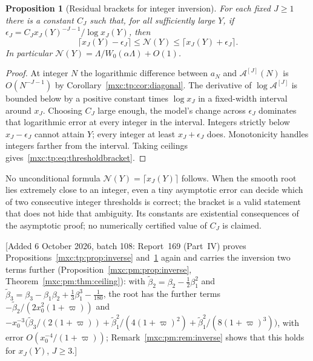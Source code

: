 \documentclass[11pt]{article}
\numberwithin{equation}{section}
\newtheorem{proposition}[theorem]{Proposition}
\theoremstyle{definition}
\theoremstyle{remark}
\begin{document}
\begin{proposition}[Residual brackets for integer inversion]\label{mxc:tp:prop:threshold}
For each fixed $J\ge1$ there is a constant $C_J$ such that, for all
sufficiently large $Y$, if
$\epsilon_J=C_Jx_J(Y)^{-J-1}/\log x_J(Y)$, then
\begin{equation}\label{mxc:tp:eq:thresholdbracket}
 \bigl\lceil x_J(Y)-\epsilon_J\bigr\rceil\le\mathcal N(Y)\le
 \bigl\lceil x_J(Y)+\epsilon_J\bigr\rceil.
\end{equation}
In particular $\mathcal N(Y)=\Lambda/W_0(\alpha\Lambda)+O(1)$.
\end{proposition}
\begin{proof}
At integer $N$ the logarithmic difference between $a_N$ and
$\mathcal A^{[J]}(N)$ is $O(N^{-J-1})$ by
Corollary~\ref{mxc:tp:cor:diagonal}. The derivative of
$\log\mathcal A^{[J]}$ is bounded below by a positive constant times
$\log x_J$ in a fixed-width interval around $x_J$. Choosing $C_J$ large
enough, the model's change across $\epsilon_J$ dominates that logarithmic
error at every integer in the interval. Integers strictly below
$x_J-\epsilon_J$ cannot attain $Y$; every integer at least
$x_J+\epsilon_J$ does. Monotonicity handles integers farther from the
interval. Taking ceilings gives~\eqref{mxc:tp:eq:thresholdbracket}.
\end{proof}

No unconditional formula $\mathcal N(Y)=\lceil x_J(Y)\rceil$ follows. When
the smooth root lies extremely close to an integer, even a tiny asymptotic
error can decide which of two consecutive integer thresholds is correct;
the bracket is a valid statement that does not hide that ambiguity. Its
constants are existential consequences of the asymptotic proof; no
numerically certified value of $C_J$ is claimed.

[Added 6 October 2026, batch 108: Report~169 (Part~IV) proves
Propositions~\ref{mxc:tp:prop:inverse} and~\ref{mxc:tp:prop:threshold} again
and carries the inversion two terms further
(Proposition~\ref{mxc:pm:prop:inverse}, Theorem~\ref{mxc:pm:thm:ceiling}): with
$\widetilde\beta_2=\beta_2-\frac12\beta_1^2$ and
$\widetilde\beta_3=\beta_3-\beta_1\beta_2+\frac13\beta_1^3-\frac1{180}$, the root
has the further terms $-\widetilde\beta_2/(2x_0^2(1+\varpi))$ and
$-x_0^{-3}\bigl(\widetilde\beta_3/(2(1+\varpi))+\widetilde\beta_1^2/(4(1+\varpi)^2)
+\widetilde\beta_1^2/(8(1+\varpi)^3)\bigr)$, with error
$O(x_0^{-4}/(1+\varpi))$; Remark~\ref{mxc:pm:rem:inverse} shows that this holds
for $x_J(Y)$, $J\ge3$.]
\end{document}
